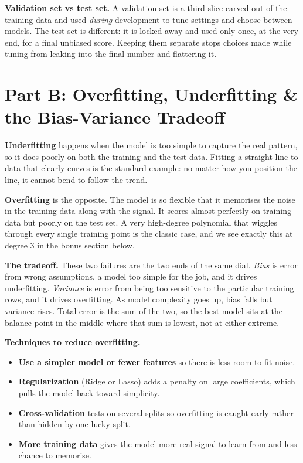 \documentclass[11pt,a4paper]{article}
\begin{document}
\textbf{Validation set vs test set.} A validation set is a third slice carved out
of the training data and used \emph{during} development to tune settings and
choose between models. The test set is different: it is locked away and used only
once, at the very end, for a final unbiased score. Keeping them separate stops
choices made while tuning from leaking into the final number and flattering it.

\section*{Part B: Overfitting, Underfitting \& the Bias-Variance Tradeoff}

\textbf{Underfitting} happens when the model is too simple to capture the real
pattern, so it does poorly on both the training and the test data. Fitting a
straight line to data that clearly curves is the standard example: no matter how
you position the line, it cannot bend to follow the trend.

\textbf{Overfitting} is the opposite. The model is so flexible that it memorises
the noise in the training data along with the signal. It scores almost perfectly
on training data but poorly on the test set. A very high-degree polynomial that
wiggles through every single training point is the classic case, and we see
exactly this at degree 3 in the bonus section below.

\textbf{The tradeoff.} These two failures are the two ends of the same dial.
\emph{Bias} is error from wrong assumptions, a model too simple for the job, and
it drives underfitting. \emph{Variance} is error from being too sensitive to the
particular training rows, and it drives overfitting. As model complexity goes up,
bias falls but variance rises. Total error is the sum of the two, so the best
model sits at the balance point in the middle where that sum is lowest, not at
either extreme.

\textbf{Techniques to reduce overfitting.}
\begin{itemize}
    \item \textbf{Use a simpler model or fewer features} so there is less room to
    fit noise.
    \item \textbf{Regularization} (Ridge or Lasso) adds a penalty on large
    coefficients, which pulls the model back toward simplicity.
    \item \textbf{Cross-validation} tests on several splits so overfitting is
    caught early rather than hidden by one lucky split.
    \item \textbf{More training data} gives the model more real signal to learn
    from and less chance to memorise.
\end{itemize}
\end{document}
